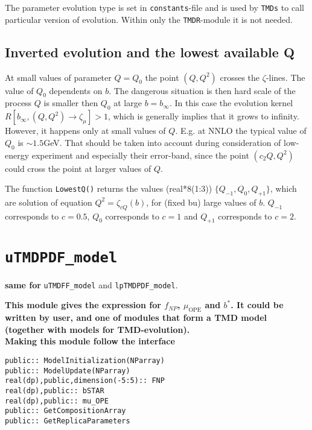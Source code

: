 \documentclass[prd,nofootinbib,eqsecnum,final]{revtex4}
\renewcommand{\(}{\left(}
\renewcommand{\)}{\right)}
\renewcommand{\[}{\left[}
\renewcommand{\]}{\right]}
\newcommand{\blue}[1]{{\color{blue} #1}}
\begin{document}
The parameter evolution type is set in \texttt{constants}-file and is used by \texttt{TMDs} to call particular version of evolution. Within only the \texttt{TMDR}-module it is not needed.

\subsection{Inverted evolution and the lowest available Q}
\label{TMDR:Q}

At small values of parameter $Q=Q_0$ the point $(Q,Q^2)$ crosses the $\zeta$-lines. The value of $Q_0$ dependents on $b$. The dangerous situation is then hard scale of the process $Q$ is smaller then $Q_0$ at large $b=b_\infty$. In this case the evolution kernel $R[b_\infty,(Q,Q^2)\to \zeta_\mu]>1$, which is generally implies that it grows to infinity. However, it happens only at small values of $Q$. E.g. at NNLO the typical value of $Q_0$ is $\sim 1.5$GeV. That should be taken into account during consideration of low-energy experiment and especially their error-band, since the point $(c_2Q,Q^2)$ could cross the point at larger values of $Q$.

The function \texttt{LowestQ()} returns the values (real*8(1:3)) $\{Q_{-1},Q_0,Q_{+1}\}$, which are solution of equation $Q^2=\zeta_{c Q}(b)$, for (fixed bu) large values of $b$. $Q_{-1}$ corresponds to $c=0.5$, $Q_0$ corresponds to $c=1$ and $Q_{+1}$ corresponds to $c=2$.

\newpage
\section{\texttt{uTMDPDF\_model}}
\begin{center}
\blue{\textbf{same for}} \texttt{uTMDFF\_model} and \texttt{lpTMDPDF\_model}.
\end{center}

\begin{tcolorbox}
\begin{center}
\textbf{This module gives the expression for $f_{NP}$, $\mu_{\text{OPE}}$ and $b^*$. It could be written by user, and one of modules that form a TMD model (together with models for TMD-evolution).}
\\
\textbf{\blue{Making this module follow the interface}}
\end{center}
\texttt{public:: ModelInitialization(NParray)}
\\
\texttt{public:: ModelUpdate(NParray)}
\\
\texttt{real(dp),public,dimension(-5:5):: FNP}
\\
\texttt{real(dp),public:: bSTAR}
\\
\texttt{real(dp),public:: mu\_OPE}
\\
\texttt{public:: GetCompositionArray}
\\
\texttt{public:: GetReplicaParameters}
\end{tcolorbox}
\end{document}
